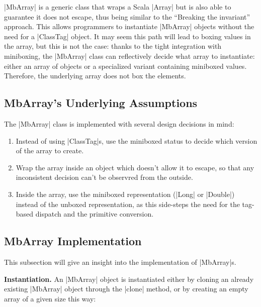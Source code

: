 

|MbArray| is a generic class that wraps a Scala |Array| but is also able to guarantee it does not escape, thus being similar to the ``Breaking the invariant'' approach. This allows programmers to instantiate |MbArray| objects without the need for a |ClassTag| object. It may seem this path will lead to boxing values in the array, but this is not the case: thanks to the tight integration with miniboxing, the |MbArray| class can reflectively decide what array to instantiate: either an array of objects or a specialized variant containing miniboxed values. Therefore, the underlying array does not box the elements.

\subsection{MbArray's Underlying Assumptions}

The |MbArray| class is implemented with several design decisions in mind: 

\begin{enumerate}
  \item Instead of using |ClassTag|s, use the miniboxed status to decide which version of the array to create.
  \item Wrap the array inside an object which doesn't allow it to escape, so that any inconsistent decision can't be observred from the outside.
  \item Inside the array, use the miniboxed representation (|Long| or |Double|) instead of the unboxed representation, as this side-steps the need for the tag-based dispatch and the primitive conversion.
\end{enumerate}

\subsection{MbArray Implementation}

This subsection will give an insight into the implementation of |MbArray|s.

\textbf{Instantiation.} An |MbArray| object is instantiated either by cloning an already existing |MbArray| object through the |clone| method, or by creating an empty array of a given size this way:

